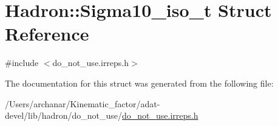 \hypertarget{structHadron_1_1Sigma10__iso__t}{}\section{Hadron\+:\+:Sigma10\+\_\+iso\+\_\+t Struct Reference}
\label{structHadron_1_1Sigma10__iso__t}


{\ttfamily \#include $<$do\+\_\+not\+\_\+use.\+irreps.\+h$>$}



The documentation for this struct was generated from the following file\+:\begin{DoxyCompactItemize}
\item 
/\+Users/archanar/\+Kinematic\+\_\+factor/adat-\/devel/lib/hadron/do\+\_\+not\+\_\+use/\mbox{\hyperlink{adat-devel_2lib_2hadron_2do__not__use_2do__not__use_8irreps_8h}{do\+\_\+not\+\_\+use.\+irreps.\+h}}\end{DoxyCompactItemize}
